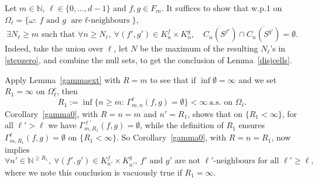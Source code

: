 \documentclass[12pt]{article}
\makeatletter
\renewenvironment{proof}[1][\proofname]{%
\par\pushQED{\qed}\normalfont%
\topsep6\p@\@plus6\p@\relax
\trivlist\item[\hskip\labelsep\bfseries#1\@addpunct{.}]%
\ignorespaces
}{%
\popQED\endtrivlist\@endpefalse
}
\numberwithin{theorem}{section}
\theoremstyle{def}
\numberwithin{equation}{section}
\newcommand{\N}{\mathbb{N}}
\makeatother
\begin{document}
\begin{proof}[Proof of Lemma~\ref{disjcells}]
Let $m\in\N$, $\ell\in\{0,\dots,d-1\}$ and $f,g\in F_m$. It suffices to show that w.p.$1$ on $\Omega_\ell=\{\omega:\ f\text{ and }g \text{ are $\ell$-neighbours}\}$,
\begin{equation}\label{stepzero}
\exists N_\ell\ge m\text{ such that }\forall n\ge N_\ell, \  \forall(f',g')\in K^f_n\times K^g_n, \quad \overline{C_n(S^{f'})}\cap\overline{C_n(S^{g'})}=\emptyset.
\end{equation}
Indeed, take the union over $\ell$, let $N$ be the maximum of the resulting $N_\ell$'s in \eqref{stepzero}, and combine  the null sets, to get the conclusion of Lemma~\ref{disjcells}.

Apply Lemma~\ref{gammaext} with $R=m$ to see that if $\inf\emptyset=\infty$ and we set $R_1=\infty$ on $\Omega_\ell^c$, then
\begin{equation}\label{R1fin}
R_1:=\inf\{n\ge m:\, \Gamma^\ell_{m,n}(f,g)=\emptyset\}<\infty\ \text{a.s.\ on }\Omega_\ell.\end{equation}
Corollary~\ref{gamma0}, with $R=n=m$ and $n'=R_1$, shows that on $\{R_1<\infty\}$, for all $\ell'>\ell$ we have  
$\Gamma^{\ell'}_{m,R_1}(f,g)=\emptyset$, while the definition of $R_1$ ensures $\Gamma^\ell_{m,R_1}(f,g)=\emptyset$ on $\{R_1<\infty\}$. 
So Corollary~\ref{gamma0}, with $R=n=R_1$, now implies
\begin{equation}\label{stepR1}
\forall n'\in\N^{\ge R_1}, \ \forall (f',g')\in K_{n'}^f\times K^g_{n'}, \ f'\text{ and }g'\text{ are not $\ell'$-neighbours for all }\ell'\ge \ell,
\end{equation}
where we note this conclusion is vacuously true if $R_1=\infty$.  


\end{proof}
\end{document}
